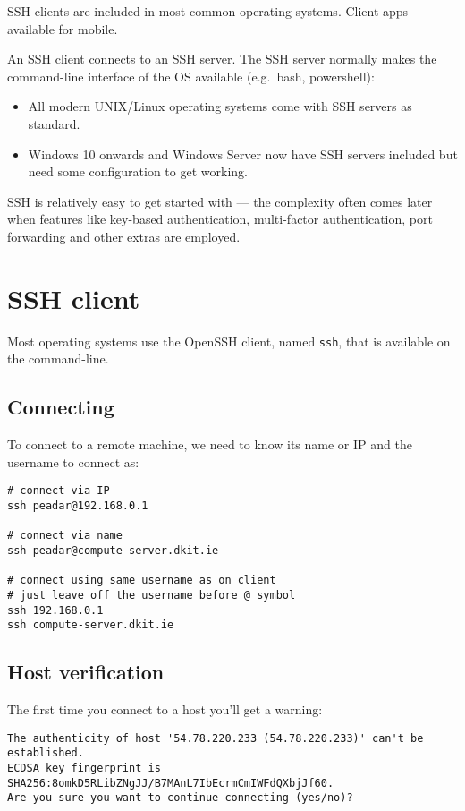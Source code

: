 \documentclass[slides]{pgnotes}
\begin{document}
SSH clients are included in most common operating systems.
Client apps available for mobile. 

An SSH client connects to an SSH server.
The SSH server normally makes the command-line interface of the OS available (e.g.~bash, powershell):
\begin{itemize}
\item All modern UNIX/Linux operating systems come with SSH servers as standard.
\item Windows 10 onwards and Windows Server now have SSH servers included but need some configuration to get working.
\end{itemize}

SSH is relatively easy to get started with --- the complexity often comes
later when features like key-based authentication, multi-factor
authentication, port forwarding and other extras are employed.


\section{SSH client}
\label{ssh-client}

Most operating systems use the OpenSSH client, named \texttt{ssh}, that is available on the command-line.

\subsection{Connecting}

To connect to a remote machine, we need to know its name or IP and the username to connect as:

\begin{verbatim}
# connect via IP
ssh peadar@192.168.0.1

# connect via name
ssh peadar@compute-server.dkit.ie

# connect using same username as on client
# just leave off the username before @ symbol
ssh 192.168.0.1
ssh compute-server.dkit.ie
\end{verbatim}

\subsection{Host verification}

The first time you connect to a host you'll get a warning:

\begin{verbatim}
The authenticity of host '54.78.220.233 (54.78.220.233)' can't be established.
ECDSA key fingerprint is SHA256:8omkD5RLibZNgJJ/B7MAnL7IbEcrmCmIWFdQXbjJf60.
Are you sure you want to continue connecting (yes/no)?
\end{verbatim}
\end{document}
